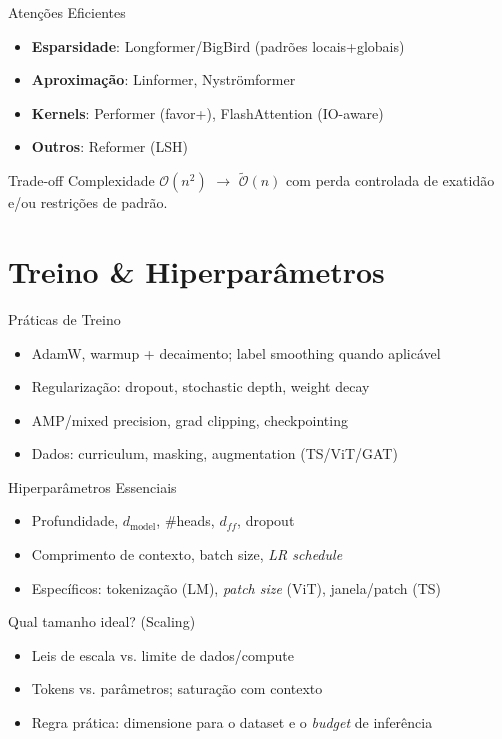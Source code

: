 \documentclass{beamer}
\begin{document}
\begin{frame}{Atenções Eficientes}
	\begin{itemize}[<+->]
		\item \textbf{Esparsidade}: Longformer/BigBird (padrões locais+globais)
		\item \textbf{Aproximação}: Linformer, Nyströmformer
		\item \textbf{Kernels}: Performer (favor+), FlashAttention (IO-aware)
		\item \textbf{Outros}: Reformer (LSH)
	\end{itemize}
	\begin{block}{Trade-off}
		Complexidade $\mathcal{O}(n^2)$ $\rightarrow$ $\tilde{\mathcal{O}}(n)$ com perda controlada de exatidão e/ou restrições de padrão.
	\end{block}
\end{frame}

\section{Treino \& Hiperparâmetros}
\begin{frame}{Práticas de Treino}
	\begin{itemize}[<+->]
		\item AdamW, warmup + decaimento; label smoothing quando aplicável
		\item Regularização: dropout, stochastic depth, weight decay
		\item AMP/mixed precision, grad clipping, checkpointing
		\item Dados: curriculum, masking, augmentation (TS/ViT/GAT)
	\end{itemize}
\end{frame}

\begin{frame}{Hiperparâmetros Essenciais}
	\begin{itemize}[<+->]
		\item Profundidade, $d_{\text{model}}$, \#heads, $d_{ff}$, dropout
		\item Comprimento de contexto, batch size, \textit{LR schedule}
		\item Específicos: tokenização (LM), \textit{patch size} (ViT), janela/patch (TS)
	\end{itemize}
\end{frame}

\begin{frame}{Qual tamanho ideal? (Scaling)}
	\begin{itemize}[<+->]
		\item Leis de escala vs. limite de dados/compute
		\item Tokens vs. parâmetros; saturação com contexto
		\item Regra prática: dimensione para o dataset e o \textit{budget} de inferência
	\end{itemize}
\end{frame}
\end{document}
